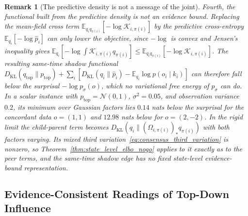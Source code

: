 \documentclass[11pt]{article}
\newtheorem{remark}{Remark}
\begin{document}
\begin{remark}[The predictive density is not a message of the joint]
Fourth, the functional built from the predictive density is not an evidence bound. Replacing the mean-field cross term $\mathbb{E}_{q_i q_{\pi(i)}}[-\log \mathcal{K}_{i,\pi(i)}]$ by the predictive cross-entropy $\mathbb{E}_{q_i}[-\log \hat{p}_i]$ can only lower the objective, since $-\log$ is convex and Jensen's inequality gives $\mathbb{E}_{q_i}[-\log \int \mathcal{K}_{i,\pi(i)} q_{\pi(i)}] \le \mathbb{E}_{q_i q_{\pi(i)}}[-\log \mathcal{K}_{i,\pi(i)}]$. The resulting same-time shadow functional $D_{\mathrm{KL}}(q_{\mathrm{top}}\|p_{\mathrm{top}}) + \sum_i [D_{\mathrm{KL}}(q_i\|\hat{p}_i) - \mathbb{E}_{q_i}\log p(o_i \mid k_i)]$ can therefore fall below the surprisal $-\log p_\sigma(o)$, which no variational free energy of $p_\sigma$ can do. In a scalar instance with $p_{\mathrm{top}} = \mathcal{N}(0,1)$, $\sigma^2 = 0.05$, and observation variance $0.2$, its minimum over Gaussian factors lies $0.14$ nats below the surprisal for the concordant data $o = (1,1)$ and $12.98$ nats below for $o = (2,-2)$. In the rigid limit the child-parent term becomes $D_{\mathrm{KL}}(q_i\|(\Omega_{i,\pi(i)})_* q_{\pi(i)})$ with both factors varying. Its mixed third variation~\eqref{eq:consensus_third_variation} is nonzero, so Theorem~\ref{thm:state_level_elbo_nogo} applies to it exactly as to the peer terms, and the same-time shadow edge has no fixed state-level evidence-bound representation.
\end{remark}

\subsection{Evidence-Consistent Readings of Top-Down Influence}
\end{document}
